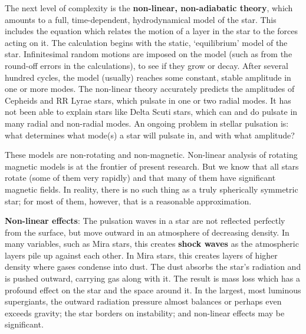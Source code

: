 \documentclass[a4paper,10pt]{article}
\begin{document}
{\noindent}The next level of complexity is the \textbf{non-linear, non-adiabatic theory}, which amounts to a full, time-dependent, hydrodynamical model of the star. This includes the equation which relates the motion of a layer in the star to the forces acting on it. The calculation begins with the static, `equilibrium' model of the star. Infinitesimal random motions are imposed on the model (such as from the round-off errors in the calculations), to see if they grow or decay. After several hundred cycles, the model (usually) reaches some constant, stable amplitude in one or more modes. The non-linear theory accurately predicts the amplitudes of Cepheids and RR Lyrae stars, which pulsate in one or two radial modes. It has not been able to explain stars like Delta Scuti stars, which can and do pulsate in many radial and non-radial modes. An ongoing problem in stellar pulsation is: what determines what mode(s) a star will pulsate in, and with what amplitude?

{\noindent}These models are non-rotating and non-magnetic. Non-linear analysis of rotating magnetic models is at the frontier of present research. But we know that all stars rotate (some of them very rapidly) and that many of them have significant magnetic fields. In reality, there is no such thing as a truly spherically symmetric star; for most of them, however, that is a reasonable approximation.

{\noindent}\textbf{Non-linear effects}: The pulsation waves in a star are not reflected perfectly from the surface, but move outward in an atmosphere of decreasing density. In many variables, such as Mira stars, this creates \textbf{shock waves} as the atmospheric layers pile up against each other. In Mira stars, this creates layers of higher density where gases condense into dust. The dust absorbs the star's radiation and is pushed outward, carrying gas along with it. The result is mass loss which has a profound effect on the star and the space around it. In the largest, most luminous supergiants, the outward radiation pressure almost balances or perhaps even exceeds gravity; the star borders on instability; and non-linear effects may be significant.
\end{document}
